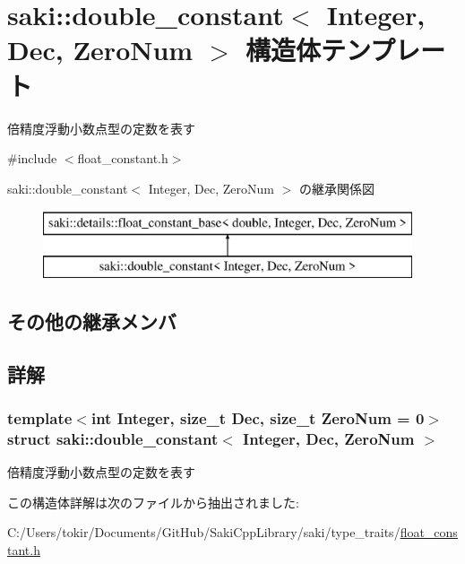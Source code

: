 \hypertarget{structsaki_1_1double__constant}{}\section{saki\+:\+:double\+\_\+constant$<$ Integer, Dec, Zero\+Num $>$ 構造体テンプレート}
\label{structsaki_1_1double__constant}


倍精度浮動小数点型の定数を表す  




{\ttfamily \#include $<$float\+\_\+constant.\+h$>$}

saki\+:\+:double\+\_\+constant$<$ Integer, Dec, Zero\+Num $>$ の継承関係図\begin{figure}[H]
\begin{center}
\leavevmode
\includegraphics[height=2.000000cm]{structsaki_1_1double__constant}
\end{center}
\end{figure}
\subsection*{その他の継承メンバ}


\subsection{詳解}
\subsubsection*{template$<$int Integer, size\+\_\+t Dec, size\+\_\+t Zero\+Num = 0$>$\newline
struct saki\+::double\+\_\+constant$<$ Integer, Dec, Zero\+Num $>$}

倍精度浮動小数点型の定数を表す 

この構造体詳解は次のファイルから抽出されました\+:\begin{DoxyCompactItemize}
\item 
C\+:/\+Users/tokir/\+Documents/\+Git\+Hub/\+Saki\+Cpp\+Library/saki/type\+\_\+traits/\mbox{\hyperlink{float__constant_8h}{float\+\_\+constant.\+h}}\end{DoxyCompactItemize}
